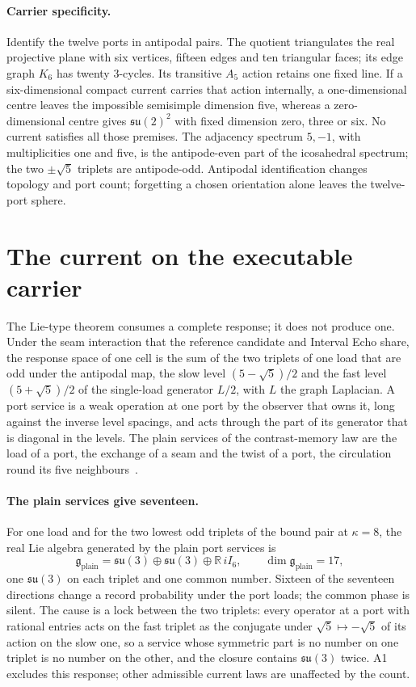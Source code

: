 \documentclass[11pt]{article}
\begin{document}
\paragraph{Carrier specificity.}
Identify the twelve ports in antipodal pairs. The quotient triangulates the
real projective plane with six vertices, fifteen edges and ten triangular
faces; its edge graph \(K_6\) has twenty \(3\)-cycles. Its transitive
\(A_5\) action retains one fixed line. If a six-dimensional compact current
carries that action internally, a one-dimensional centre leaves the
impossible semisimple dimension five, whereas a zero-dimensional centre gives
\(\mathfrak{su}(2)^2\) with fixed dimension zero, three or six. No current
satisfies all those premises. The adjacency spectrum \(5,-1\), with
multiplicities one and five, is the antipode-even part of the icosahedral
spectrum; the two \(\pm\sqrt5\) triplets are antipode-odd. Antipodal
identification changes topology and port count; forgetting a chosen
orientation alone leaves the twelve-port sphere.

\section{The current on the executable carrier}
\label{sec:executable-current}

The Lie-type theorem consumes a complete response; it does not produce one.
Under the seam interaction that the reference candidate and Interval Echo
share, the response space of one cell is the sum of the two
triplets of one load that are odd under the antipodal map, the slow level
\((5-\sqrt5)/2\) and the fast level \((5+\sqrt5)/2\) of the single-load
generator \(L/2\), with \(L\) the graph Laplacian. A port service is a weak
operation at one port by the observer that owns it, long against the inverse
level spacings, and
acts through the part of its generator that is diagonal in the levels. The
plain services of the contrast-memory law are the load of a port, the
exchange of a seam and the twist of a port, the circulation round its five
neighbours~\cite{ophmodel}.

\paragraph{The plain services give seventeen.}
For one load and for the two lowest odd triplets of the bound pair at
\(\kappa=8\), the real Lie algebra generated by the plain port services is
\[
 \mathfrak g_{\mathrm{plain}}
 =\mathfrak{su}(3)\oplus\mathfrak{su}(3)\oplus\mathbb R\,iI_6,
 \qquad \dim\mathfrak g_{\mathrm{plain}}=17,
\]
one \(\mathfrak{su}(3)\) on each triplet and one common number. Sixteen of the
seventeen directions change a record probability under the port loads; the
common phase is silent. The cause is a lock between the two triplets: every
operator at a port with rational entries acts on the fast triplet as the
conjugate under \(\sqrt5\mapsto-\sqrt5\) of its action on the slow one, so a
service whose symmetric part is no number on one triplet is no number on the
other, and the closure contains \(\mathfrak{su}(3)\) twice. A1 excludes this
response; other admissible current laws are unaffected by the count.
\end{document}
